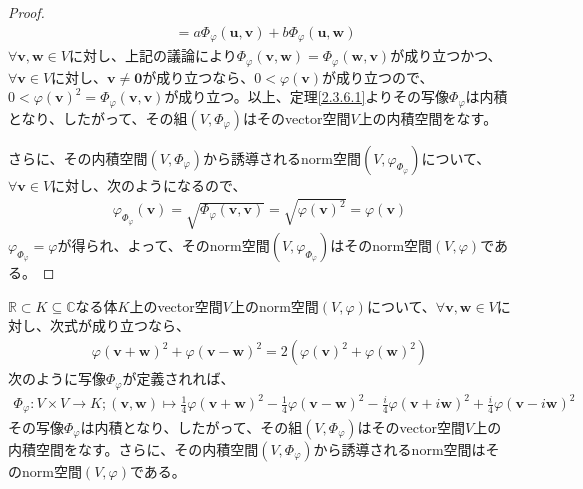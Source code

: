 \documentclass[dvipdfmx]{jsarticle}
\begin{document}
\begin{proof}
\begin{align*}
&= a\varPhi_{\varphi}\left( \mathbf{u},\mathbf{v} \right) + b\varPhi_{\varphi}\left( \mathbf{u},\mathbf{w} \right)
\end{align*}
$\forall\mathbf{v},\mathbf{w} \in V$に対し、上記の議論により$\varPhi_{\varphi}\left( \mathbf{v},\mathbf{w} \right) = \varPhi_{\varphi}\left( \mathbf{w},\mathbf{v} \right)$が成り立つかつ、$\forall\mathbf{v} \in V$に対し、$\mathbf{v} \neq \mathbf{0}$が成り立つなら、$0 < \varphi\left( \mathbf{v} \right)$が成り立つので、$0 < {\varphi\left( \mathbf{v} \right)}^{2} = \varPhi_{\varphi}\left( \mathbf{v},\mathbf{v} \right)$が成り立つ。以上、定理\ref{2.3.6.1}よりその写像$\varPhi_{\varphi}$は内積となり、したがって、その組$\left( V,\varPhi_{\varphi} \right)$はそのvector空間$V$上の内積空間をなす。\par
さらに、その内積空間$\left( V,\varPhi_{\varphi} \right)$から誘導されるnorm空間$\left( V,\varphi_{\varPhi_{\varphi}} \right)$について、$\forall\mathbf{v} \in V$に対し、次のようになるので、
\begin{align*}
\varphi_{\varPhi_{\varphi}}\left( \mathbf{v} \right) = \sqrt{\varPhi_{\varphi}\left( \mathbf{v},\mathbf{v} \right)} = \sqrt{{\varphi\left( \mathbf{v} \right)}^{2}} = \varphi\left( \mathbf{v} \right)
\end{align*}
$\varphi_{\varPhi_{\varphi}} = \varphi$が得られ、よって、そのnorm空間$\left( V,\varphi_{\varPhi_{\varphi}} \right)$はそのnorm空間$(V,\varphi)$である。
\end{proof}
\begin{thm}\label{2.3.6.22}
$\mathbb{R} \subset K \subseteq \mathbb{C}$なる体$K$上のvector空間$V$上のnorm空間$(V,\varphi)$について、$\forall\mathbf{v},\mathbf{w} \in V$に対し、次式が成り立つなら、
\begin{align*}
{\varphi\left( \mathbf{v} + \mathbf{w} \right)}^{2} + {\varphi\left( \mathbf{v} - \mathbf{w} \right)}^{2} = 2\left( {\varphi\left( \mathbf{v} \right)}^{2} + {\varphi\left( \mathbf{w} \right)}^{2} \right)
\end{align*}
次のように写像$\varPhi_{\varphi}$が定義されれば、
\begin{align*}
\varPhi_{\varphi}:V \times V \rightarrow K;\left( \mathbf{v},\mathbf{w} \right) \mapsto \frac{1}{4}{\varphi\left( \mathbf{v} + \mathbf{w} \right)}^{2} - \frac{1}{4}{\varphi\left( \mathbf{v} - \mathbf{w} \right)}^{2} - \frac{i}{4}{\varphi\left( \mathbf{v} + i\mathbf{w} \right)}^{2} + \frac{i}{4}{\varphi\left( \mathbf{v} - i\mathbf{w} \right)}^{2}
\end{align*}
その写像$\varPhi_{\varphi}$は内積となり、したがって、その組$\left( V,\varPhi_{\varphi} \right)$はそのvector空間$V$上の内積空間をなす。さらに、その内積空間$\left( V,\varPhi_{\varphi} \right)$から誘導されるnorm空間はそのnorm空間$(V,\varphi)$である。
\end{thm}
\end{document}
